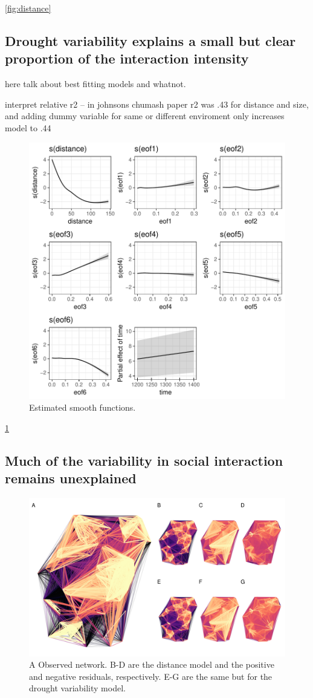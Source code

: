 \documentclass[fleqn,10pt]{wlscirep}
\begin{document}
\ref{fig:distance}

\subsection*{Drought variability explains a small but clear proportion of the interaction intensity}
here talk about best fitting models and whatnot.

interpret relative r2 -- in johnsons chumash paper r2 was .43 for distance and size, and adding dummy variable for same or different enviroment only increases model to .44

\begin{figure}[!htbp]
\centering
\includegraphics[width=.6\linewidth]{figures/smooths.pdf}
\caption{Estimated smooth functions.}
\label{fig:smooths}
\end{figure}

\ref{fig:smooths}


\subsection*{Much of the variability in social interaction remains unexplained}

\begin{figure}[!htbp]
\centering
\includegraphics[width=.8\linewidth]{figures/null_model.png}
\caption{A Observed network. B-D are the distance model and the positive and negative residuals, respectively. E-G are the same but for the drought variability model.}
\label{fig:residuals}
\end{figure}
\end{document}
